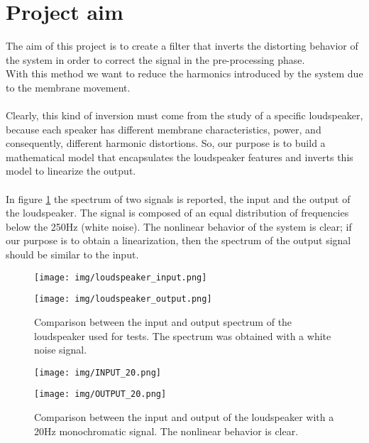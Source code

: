 \section{Project aim}
The aim of this project is to create a filter that inverts the distorting behavior of the system in order to correct the signal in the pre-processing phase.\\
With this method we want to reduce the harmonics introduced by the system due to the membrane movement.\\\\
Clearly, this kind of inversion must come from the study of a specific loudspeaker, because each speaker has different membrane characteristics, power, and consequently, different harmonic distortions. So, our purpose is to build a mathematical model that encapsulates the loudspeaker features and inverts this model to linearize the output.\\\\
In figure \ref{fig:loudspeaker_behavior} the spectrum of two signals is reported, the input and the output of the loudspeaker. The signal is composed of an equal distribution of frequencies below the 250Hz (white noise). The nonlinear behavior of the system is clear; if our purpose is to obtain a linearization, then the spectrum of the output signal should be similar to the input.\\
\begin{figure}
\begin{minipage}{.48\textwidth}
\centering
\texttt{[image: img/loudspeaker\_input.png]} 
\end{minipage}
\hspace{2mm}
\begin{minipage}{.48\textwidth}
\centering
\texttt{[image: img/loudspeaker\_output.png]} 
\end{minipage}
\caption{Comparison between the input and output spectrum of the loudspeaker used for tests. The spectrum was obtained with a white noise signal.}\label{fig:loudspeaker_behavior}
\end{figure}
\begin{figure}
\begin{minipage}{\textwidth}
\centering
\texttt{[image: img/INPUT\_20.png]} 
\end{minipage}
\hspace{2mm}
\begin{minipage}{\textwidth}
\centering
\texttt{[image: img/OUTPUT\_20.png]} 
\end{minipage}
\caption{Comparison between the input and output of the loudspeaker with a 20Hz monochromatic signal. The nonlinear behavior is clear.}\label{fig:comparison_in_out_20}
\end{figure}

